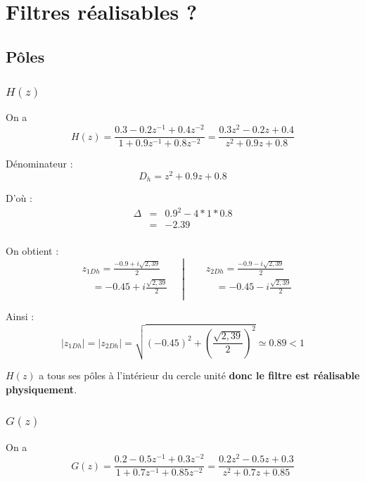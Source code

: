 \documentclass[12,french]{report}
\begin{document}
\chapter{Filtres réalisables ?}

\section{Pôles}

\subsection{$H(z)$}

\vspace{0.25cm}

On a $$ H(z) = \frac{0.3-0.2z^{-1}+0.4z^{-2}}{1+0.9z^{-1}+0.8z^{-2}} = \frac{0.3z^2-0.2z+0.4}{z^2+0.9z+0.8} $$

Dénominateur : $$ D_h= z^2+0.9z+0.8 $$

D'où : $$ \begin{array}{ccl}
\Delta & = & 0.9^2-4*1*0.8 \\
	   & = & -2.39 \\
\end{array} $$

On obtient :
$$\left.\begin{aligned}
	&z_{1Dh} = \frac{-0.9+i\sqrt{2,39}}{2} \\
	&\quad = -0.45 + i\frac{\sqrt{2,39}}{2} \\
\end{aligned}\quad\right|
\quad\left.\begin{aligned}
	&z_{2Dh} = \frac{-0.9-i\sqrt{2,39}}{2}\\
	&\quad = -0.45 - i\frac{\sqrt{2,39}}{2} \\
\end{aligned}\right.$$

Ainsi :
$$ |z_{1Dh}|=|z_{2Dh}|=\sqrt{(-0.45)^2+\left(\frac{\sqrt{2,39}}{2}\right)^2} \simeq 0.89 < 1 $$


$H(z)$ a tous ses pôles à l'intérieur du cercle unité \textbf{donc le filtre est réalisable physiquement}.\\

\subsection{$G(z)$}

\vspace{0.25cm}

On a $$ G(z) = \frac{0.2-0.5z^{-1}+0.3z^{-2}}{1+0.7z^{-1}+0.85z^{-2}} = \frac{0.2z^2-0.5z+0.3}{z^2+0.7z+0.85} $$
\end{document}
